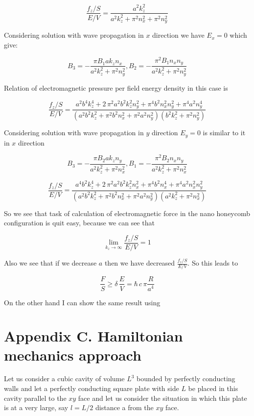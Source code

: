 \documentclass[11pt]{article}
\begin{document}
\[\frac{f_z/S}{E/V} = \frac{a^{2} k_{z}^{2}}{a^{2} k_{z}^{2} + \pi^{2} n_{x}^{2} + \pi^{2} n_{y}^{2}}\]

    Considering solution with wave propagation in \(x\) direction we have
\(E_x = 0\) which give:

\[B_3 = -\frac{\pi B_{1} a k_{z} n_{x}}{a^{2} k_{z}^{2} + \pi^{2} n_{y}^{2}}, 
B_2 = -\frac{\pi^{2} B_{1} n_{x} n_{y}}{a^{2} k_{z}^{2} + \pi^{2} n_{y}^{2}}\]

Relation of electromagnetic pressure per field energy density in this
case is

\[\frac{f_z/S}{E/V} = \frac{a^{2} b^{4} k_{z}^{4} + 2 \, \pi^{2} a^{2} b^{2} k_{z}^{2} n_{y}^{2} + \pi^{4} b^{2} n_{x}^{2} n_{y}^{2} + \pi^{4} a^{2} n_{y}^{4}}{{\left(a^{2} b^{2} k_{z}^{2} + \pi^{2} b^{2} n_{x}^{2} + \pi^{2} a^{2} n_{y}^{2}\right)} {\left(b^{2} k_{z}^{2} + \pi^{2} n_{y}^{2}\right)}}\]

Considering solution with wave propagation in \(y\) direction
\(E_y = 0\) is similar to it in \(x\) direction

    \[B_3 = -\frac{\pi B_{2} a k_{z} n_{y}}{a^{2} k_{z}^{2} + \pi^{2} n_{x}^{2}}, 
B_1 = -\frac{\pi^{2} B_{2} n_{x} n_{y}}{a^{2} k_{z}^{2} + \pi^{2} n_{x}^{2}}\]

\[\frac{f_z/S}{E/V} = \frac{a^{4} b^{2} k_{z}^{4} + 2 \, \pi^{2} a^{2} b^{2} k_{z}^{2} n_{x}^{2} + \pi^{4} b^{2} n_{x}^{4} + \pi^{4} a^{2} n_{x}^{2} n_{y}^{2}}{{\left(a^{2} b^{2} k_{z}^{2} + \pi^{2} b^{2} n_{x}^{2} + \pi^{2} a^{2} n_{y}^{2}\right)} {\left(a^{2} k_{z}^{2} + \pi^{2} n_{x}^{2}\right)}}\]

    So we see that task of calculation of electromagnetic force in the nano
honeycomb configuration is quit easy, because we can see that

\[\lim_{k_z \to \infty}\frac{f_z/S}{E/V} = 1\]

Also we see that if we decrease \(a\) then we have decreased
\(\frac{f_z/S}{E/V}\). So this leads to

\[\frac{F}{S} \geq \delta\,\frac{E}{V} = \hbar\,c\, \pi\frac{R}{a^4}\]

On the other hand I can show the same result using

    \section{Appendix C. Hamiltonian mechanics
approach}\label{appendix-c.-hamiltonian-mechanics-approach}

    Let us consider a cubic cavity of volume \(L^3\) bounded by perfectly
conducting walls and let a perfectly conducting square plate with side
\(L\) be placed in this cavity parallel to the \(xy\) face and let us
consider the situation in which this plate is at a very large, say
\(l = L/2\) distance a from the \(xy\) face.
\end{document}
